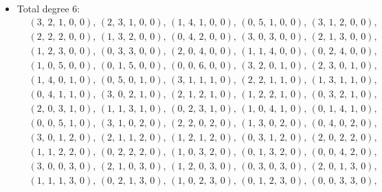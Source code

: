 \documentclass[12pt,reqno]{amsart}
\theoremstyle{definition}
\theoremstyle{remark}
\begin{document}
\begin{itemize}
    \item Total degree 6:
    {\tiny \begin{align*} 
    & \left(3,\,2,\,1,\,0,\,0\right),\,\left(2,\,3,\,1,\,0,\,0\right),\,\left(1,\,4,\,1,\,0,\,0\right),\,\left(0,\,5,\,1,\,0,\,0\right),\,\left(3,\,1,\,2,\,0,\,0\right), \\
    & \left(2,\,2,\,2,\,0,\,0\right),\,\left(1,\,3,\,2,\,0,\,0\right),\,\left(0,\,4,\,2,\,0,\,0\right),\,\left(3,\,0,\,3,\,0,\,0\right),\,\left(2,\,1,\,3,\,0,\,0\right), \\
    &\left(1,\,2,\,3,\,0,\,0\right),\,\left(0,\,3,\,3,\,0,\,0\right),\,\left(2,\,0,\,4,\,0,\,0\right),\,\left(1,\,1,\,4,\,0,\,0\right),\,\left(0,\,2,\,4,\,0,\,0\right), \\
    &\left(1,\,0,\,5,\,0,\,0\right),\,\left(0,\,1,\,5,\,0,\,0\right),\,\left(0,\,0,\,6,\,0,\,0\right),\,\left(3,\,2,\,0,\,1,\,0\right),\,\left(2,\,3,\,0,\,1,\,0\right),\\
    &\left(1,\,4,\,0,\,1,\,0\right),\,\left(0,\,5,\,0,\,1,\,0\right),\,\left(3,\,1,\,1,\,1,\,0\right),\,\left(2,\,2,\,1,\,1,\,0\right),\,\left(1,\,3,\,1,\,1,\,0\right),\\
    &\left(0,\,4,\,1,\,1,\,0\right),\,\left(3,\,0,\,2,\,1,\,0\right),\,\left(2,\,1,\,2,\,1,\,0\right),\,\left(1,\,2,\,2,\,1,\,0\right),\,\left(0,\,3,\,2,\,1,\,0\right),\\
    &\left(2,\,0,\,3,\,1,\,0\right),\,\left(1,\,1,\,3,\,1,\,0\right),\,\left(0,\,2,\,3,\,1,\,0\right),\,\left(1,\,0,\,4,\,1,\,0\right),\,\left(0,\,1,\,4,\,1,\,0\right),\\
    &\left(0,\,0,\,5,\,1,\,0\right),\,\left(3,\,1,\,0,\,2,\,0\right),\,\left(2,\,2,\,0,\,2,\,0\right),\,\left(1,\,3,\,0,\,2,\,0\right),\,\left(0,\,4,\,0,\,2,\,0\right),\\
    &\left(3,\,0,\,1,\,2,\,0\right),\,\left(2,\,1,\,1,\,2,\,0\right),\,\left(1,\,2,\,1,\,2,\,0\right),\,\left(0,\,3,\,1,\,2,\,0\right),\,\left(2,\,0,\,2,\,2,\,0\right),\\
    &\left(1,\,1,\,2,\,2,\,0\right),\,\left(0,\,2,\,2,\,2,\,0\right),\,\left(1,\,0,\,3,\,2,\,0\right),\,\left(0,\,1,\,3,\,2,\,0\right),\,\left(0,\,0,\,4,\,2,\,0\right),\\
    &\left(3,\,0,\,0,\,3,\,0\right),\,\left(2,\,1,\,0,\,3,\,0\right),\,\left(1,\,2,\,0,\,3,\,0\right),\,\left(0,\,3,\,0,\,3,\,0\right),\,\left(2,\,0,\,1,\,3,\,0\right),\\
    &\left(1,\,1,\,1,\,3,\,0\right),\,\left(0,\,2,\,1,\,3,\,0\right),\,\left(1,\,0,\,2,\,3,\,0\right),\,\left(0,\,1,\,2,\,3,\,0\right),\,\left(0,\,0,\,3,\,3,\,0\right),\\

\end{align*}}
\end{itemize}
\end{document}
